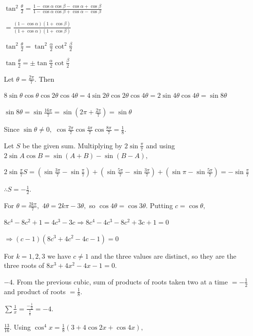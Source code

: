   $\tan^2\frac{\theta}{2} = \frac{1 - \cos\alpha\cos\beta - \cos\alpha + \cos\beta}{1 - \cos\alpha\cos\beta + \cos\alpha -
  \cos\beta}$

  $= \frac{(1 - \cos\alpha)(1 + \cos\beta)}{(1 + \cos\alpha)(1 + \cos\beta)}$

  $\tan^2\frac{\theta}{2} = \tan^2\frac{\alpha}{2}\cot^2\frac{\beta}{2}$

  $\tan\frac{\theta}{2} = \pm\tan\frac{\alpha}{2}\cot\frac{\beta}{2}$
\stopitemize

\subject{Challenging Problems}
\startitemize[n, 1*broad]
\item Let $\theta = \frac{2\pi}{7}.$ Then

  $8\sin\theta\cos\theta\cos2\theta\cos4\theta = 4\sin2\theta\cos2\theta\cos4\theta = 2\sin4\theta\cos4\theta = \sin8\theta$

  $\sin8\theta = \sin\frac{16\pi}{7} = \sin\left(2\pi + \frac{2\pi}{7}\right) = \sin\theta$

  Since $\sin\theta \neq 0,$ $\cos\frac{2\pi}{7}\cos\frac{4\pi}{7}\cos\frac{8\pi}{7} = \frac{1}{8}$.

\item Let $S$ be the given sum. Multiplying by $2\sin\frac{\pi}{7}$ and using $2\sin A\cos B = \sin(A + B) - \sin(B - A),$

  $2\sin\frac{\pi}{7}S = \left(\sin\frac{3\pi}{7} - \sin\frac{\pi}{7}\right) + \left(\sin\frac{5\pi}{7} -
  \sin\frac{3\pi}{7}\right) + \left(\sin\pi - \sin\frac{5\pi}{7}\right) = -\sin\frac{\pi}{7}$

  $\therefore S = -\frac{1}{2}$.

\item For $\theta = \frac{2k\pi}{7},$ $4\theta = 2k\pi - 3\theta,$ so $\cos4\theta = \cos3\theta$. Putting $c = \cos\theta,$

  $8c^4 - 8c^2 + 1 = 4c^3 - 3c \Rightarrow 8c^4 - 4c^3 - 8c^2 + 3c + 1 = 0$

  $\Rightarrow (c - 1)(8c^3 + 4c^2 - 4c - 1) = 0$

  For $k = 1, 2, 3$ we have $c \neq 1$ and the three values are distinct, so they are the three roots of $8x^3 + 4x^2 - 4x -
  1 = 0$.

\item $-4$. From the previous cubic, sum of products of roots taken two at a time $= -\frac{1}{2}$ and product of roots $=
  \frac{1}{8}$.

  $\sum\frac{1}{x} = \frac{-\frac{1}{2}}{\frac{1}{8}} = -4$.

\item $\frac{13}{16}$. Using $\cos^4x = \frac{1}{8}(3 + 4\cos2x + \cos4x),$

